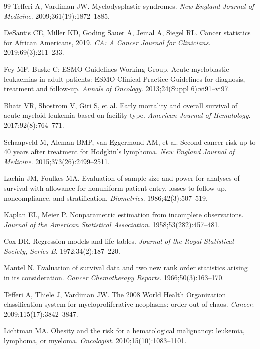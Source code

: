 ﻿\documentclass[12pt,a4paper]{article}
\theoremstyle{definition}
\begin{document}
\begin{thebibliography}{99}
  Tefferi A, Vardiman JW.
  Myelodysplastic syndromes.
  \textit{New England Journal of Medicine}. 2009;361(19):1872--1885.

  DeSantis CE, Miller KD, Goding Sauer A, Jemal A, Siegel RL.
  Cancer statistics for African Americans, 2019.
  \textit{CA: A Cancer Journal for Clinicians}. 2019;69(3):211--233.

  Fey MF, Buske C; ESMO Guidelines Working Group.
  Acute myeloblastic leukaemias in adult patients: ESMO Clinical Practice
  Guidelines for diagnosis, treatment and follow-up.
  \textit{Annals of Oncology}. 2013;24(Suppl 6):vi91--vi97.

  Bhatt VR, Shostrom V, Giri S, et al.
  Early mortality and overall survival of acute myeloid leukemia based on facility
  type.
  \textit{American Journal of Hematology}. 2017;92(8):764--771.

  Schaapveld M, Aleman BMP, van Eggermond AM, et al.
  Second cancer risk up to 40 years after treatment for Hodgkin's lymphoma.
  \textit{New England Journal of Medicine}. 2015;373(26):2499--2511.

  Lachin JM, Foulkes MA.
  Evaluation of sample size and power for analyses of survival with allowance
  for nonuniform patient entry, losses to follow-up, noncompliance, and stratification.
  \textit{Biometrics}. 1986;42(3):507--519.

  Kaplan EL, Meier P.
  Nonparametric estimation from incomplete observations.
  \textit{Journal of the American Statistical Association}. 1958;53(282):457--481.

  Cox DR.
  Regression models and life-tables.
  \textit{Journal of the Royal Statistical Society, Series B}. 1972;34(2):187--220.

  Mantel N.
  Evaluation of survival data and two new rank order statistics arising in its
  consideration.
  \textit{Cancer Chemotherapy Reports}. 1966;50(3):163--170.

  Tefferi A, Thiele J, Vardiman JW.
  The 2008 World Health Organization classification system for myeloproliferative
  neoplasms: order out of chaos.
  \textit{Cancer}. 2009;115(17):3842--3847.

  Lichtman MA.
  Obesity and the risk for a hematological malignancy: leukemia, lymphoma, or
  myeloma.
  \textit{Oncologist}. 2010;15(10):1083--1101.

\end{thebibliography}
\end{document}
